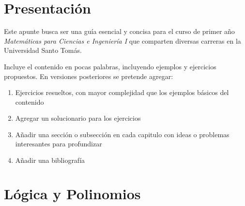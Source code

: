 \documentclass[11pt, twoside]{book}
\begin{document}

\restoregeometry
\nopagecolor

\tableofcontents

\chapter*{Presentación}
Este apunte busca ser una guía esencial y concisa para el curso de primer año \emph{Matemáticas para Ciencias e Ingeniería I} que comparten diversas carreras en la Universidad Santo Tomás.


Incluye el contenido en pocas palabras, incluyendo ejemplos y ejercicios propuestos. En versiones posteriores se pretende agregar:
\begin{enumerate}[label=\roman*)]
    \item Ejercicios resueltos, con mayor complejidad que los ejemplos básicos del contenido
    \item Agregar un solucionario para los ejercicios
    \item Añadir una sección o subsección en cada capitulo con ideas o problemas interesantes para profundizar
    \item Añadir una bibliografía
\end{enumerate}

\chapter{Lógica y Polinomios}
\end{document}
